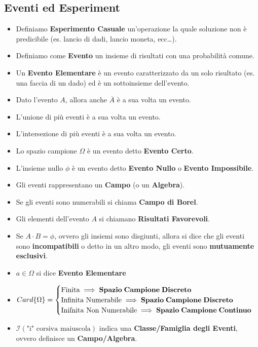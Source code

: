 \documentclass{article}
\begin{document}
\subsection{Eventi ed Esperiment}
\begin{itemize}
    \item Definiamo \textbf{Esperimento Casuale} un’operazione la quale soluzione non è predicibile (es. lancio di dadi, lancio moneta, ecc…).
    \item Definiamo come \textbf{Evento} un insieme di risultati con una probabilità comune.
    \item Un \textbf{Evento Elementare} è un evento caratterizzato da un solo risultato (es. una faccia di un dado) ed è un sottoinsieme dell’evento.
    \item Dato l’evento $A$, allora anche $\overline A$ è a sua volta un evento.
    \item L’unione di più eventi è a sua volta un evento.
    \item L’intersezione di più eventi è a sua volta un evento.
    \item Lo spazio campione $\Omega$ è un evento detto \textbf{Evento Certo}.
    \item L’insieme nullo $\phi$ è un evento detto \textbf{Evento Nullo} o \textbf{Evento Impossibile}.
    \item Gli eventi rappresentano un \textbf{Campo} (o un \textbf{Algebra}).
    \item Se gli eventi sono numerabili si chiama \textbf{Campo di Borel}.
    \item Gli elementi dell’evento $A$ si chiamano \textbf{Risultati Favorevoli}.
    \item Se $A \cdot B = \phi$, ovvero gli insiemi sono disgiunti, allora si dice che gli eventi sono \textbf{incompatibili} o detto in un altro modo, gli eventi sono \textbf{mutuamente esclusivi}.
    \item $a \in \Omega$ si dice \textbf{Evento Elementare}
    \item $Card\{ \Omega \} = \begin{cases} 
        \text{Finita}  \implies \bf{Spazio} \; Campione \; Discreto\\
        \text{Infinita Numerabile} \implies \bf{Spazio} \; Campione \; Discreto\\
        \text{Inifnita Non Numerabile} \implies \bf{Spazio} \; Campione \; Continuo
        \end{cases}$
    \item $\mathcal{I} \left( \text{"i" corsiva maiuscola} \right)$ indica una \textbf{Classe/Famiglia degli Eventi}, ovvero definisce un \textbf{Campo/Algebra}.
\end{itemize}
\end{document}
